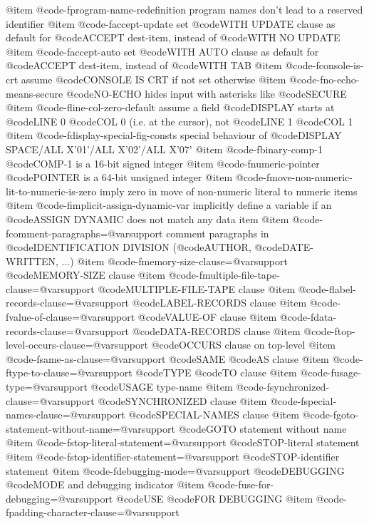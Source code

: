 @item @code{-fprogram-name-redefinition}
program names don't lead to a reserved identifier
@item @code{-faccept-update}
set @code{WITH UPDATE} clause as default for @code{ACCEPT} dest-item, instead of @code{WITH NO UPDATE}
@item @code{-faccept-auto}
set @code{WITH AUTO} clause as default for @code{ACCEPT} dest-item, instead of @code{WITH TAB}
@item @code{-fconsole-is-crt}
assume @code{CONSOLE IS CRT} if not set otherwise
@item @code{-fno-echo-means-secure}
@code{NO-ECHO} hides input with asterisks like @code{SECURE}
@item @code{-fline-col-zero-default}
assume a field @code{DISPLAY} starts at @code{LINE} 0 @code{COL} 0 (i.e. at the cursor), not @code{LINE} 1 @code{COL} 1
@item @code{-fdisplay-special-fig-consts}
special behaviour of @code{DISPLAY SPACE}/ALL X'01'/ALL X'02'/ALL X'07'
@item @code{-fbinary-comp-1}
@code{COMP}-1 is a 16-bit signed integer
@item @code{-fnumeric-pointer}
@code{POINTER} is a 64-bit unsigned integer
@item @code{-fmove-non-numeric-lit-to-numeric-is-zero}
imply zero in move of non-numeric literal to numeric items
@item @code{-fimplicit-assign-dynamic-var}
implicitly define a variable if an @code{ASSIGN DYNAMIC} does not match any data item
@item @code{-fcomment-paragraphs=@var{support}}
comment paragraphs in @code{IDENTIFICATION DIVISION} (@code{AUTHOR}, @code{DATE-WRITTEN}, ...)
@item @code{-fmemory-size-clause=@var{support}}
@code{MEMORY-SIZE} clause
@item @code{-fmultiple-file-tape-clause=@var{support}}
@code{MULTIPLE-FILE-TAPE} clause
@item @code{-flabel-records-clause=@var{support}}
@code{LABEL-RECORDS} clause
@item @code{-fvalue-of-clause=@var{support}}
@code{VALUE-OF} clause
@item @code{-fdata-records-clause=@var{support}}
@code{DATA-RECORDS} clause
@item @code{-ftop-level-occurs-clause=@var{support}}
@code{OCCURS} clause on top-level
@item @code{-fsame-as-clause=@var{support}}
@code{SAME} @code{AS} clause
@item @code{-ftype-to-clause=@var{support}}
@code{TYPE} @code{TO} clause
@item @code{-fusage-type=@var{support}}
@code{USAGE} type-name
@item @code{-fsynchronized-clause=@var{support}}
@code{SYNCHRONIZED} clause
@item @code{-fspecial-names-clause=@var{support}}
@code{SPECIAL-NAMES} clause
@item @code{-fgoto-statement-without-name=@var{support}}
@code{GOTO} statement without name
@item @code{-fstop-literal-statement=@var{support}}
@code{STOP}-literal statement
@item @code{-fstop-identifier-statement=@var{support}}
@code{STOP}-identifier statement
@item @code{-fdebugging-mode=@var{support}}
@code{DEBUGGING} @code{MODE} and debugging indicator
@item @code{-fuse-for-debugging=@var{support}}
@code{USE} @code{FOR DEBUGGING}
@item @code{-fpadding-character-clause=@var{support}}
